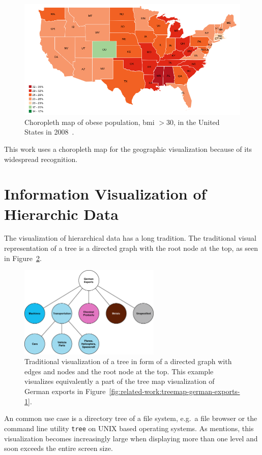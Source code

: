 \begin{figure}[ht]
  \includegraphics[width=\textwidth]{figures/related-work/choropleth}
  \caption{%
    Choropleth map of obese population, \gls{bmi} $ > 30 $, in the United States in 2008~\parencite{NCCDPHP2017}.
  }\label{fig:related-work:choropleth}
\end{figure}

This work uses a choropleth map for the geographic visualization because of its widespread recognition.

\section{Information Visualization of Hierarchic Data}
The visualization of hierarchical data has a long tradition.
The traditional visual representation of a tree is a directed graph with the root node at the top, as seen in Figure~\ref{fig:related-work:tree-graph}.
\begin{figure}[ht]
  \centering
  \includegraphics[width=0.6\textwidth]{figures/related-work/Treegraph}
  \caption{
    Traditional visualization of a tree in form of a directed graph with edges and nodes and the root node at the top.
    This example visualizes equivalently a part of the tree map visualization of German exports in Figure~\ref{fig:related-work:treemap-german-exports-1}.
  }
  \label{fig:related-work:tree-graph}
\end{figure}
An common use case is a directory tree of a file system, e.g.\ a file browser or the command line utility \texttt{tree} on UNIX based operating systems.
As \textcite{Shneiderman1992} mentions, this visualization becomes increasingly large when displaying more than one level and soon exceeds the entire screen size.

